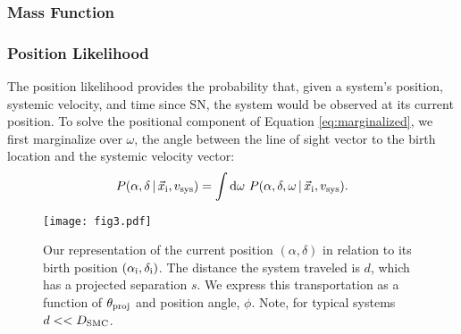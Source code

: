 \documentclass[usenatbib]{mnras}
\newcommand{\given}{\,|\,}
\newcommand{\dd}{\mathrm{d}}
\begin{document}
\subsubsection{Mass Function}
\label{sec:mass_function}





\subsubsection{Position Likelihood} 
\label{sec:ra_dec}

The position likelihood provides the probability that, given a system's position, systemic velocity, and time since SN, the system would be observed at its current position. 
To solve the positional component of Equation \ref{eq:marginalized}, we first marginalize over $\omega$, the angle between the line of sight vector to the birth location and the systemic velocity vector:
\begin{equation}
P(\alpha, \delta \given \vec{x}_{\rm i}, v_{\rm sys} ) = \int \dd \omega\ P(\alpha, \delta, \omega \given \vec{x}_{\rm i}, v_{\rm sys} ). \label{eq:P_pos_1}
\end{equation}

\begin{figure}
\begin{center}
\texttt{[image: fig3.pdf]}
\caption{Our representation of the current position $(\alpha, \delta)$ in relation to its birth position $(\alpha_{\rm i}, \delta_{\rm i})$. The distance the system traveled is $d$, which has a projected separation $s$. We express this transportation as a function of $\theta_{\rm proj}$ and position angle, $\phi$. Note, for typical systems $d << D_{\rm SMC}$.}
\label{fig:position_projection}
\end{center}
\end{figure}
\end{document}
